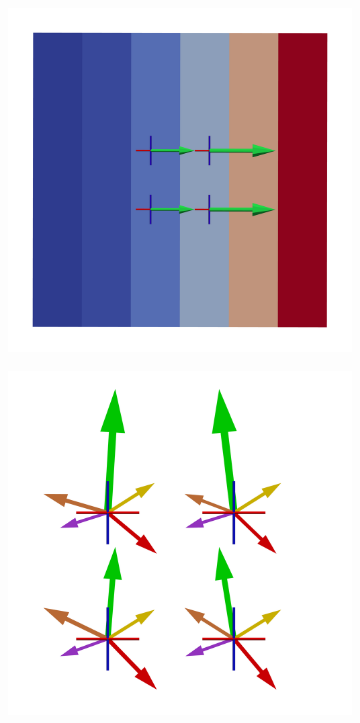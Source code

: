 \begin{figure}
    \begin{subfigure}[b]{0.49\textwidth}
        \includegraphics[width=\textwidth]{Images/gradient.png}
        \caption{}
        \label{fig:gradient}
    \end{subfigure}
    \begin{subfigure}[b]{0.49\textwidth}
        \includegraphics[width=\textwidth]{Images/samples.png}

\end{subfigure}
\end{figure}
